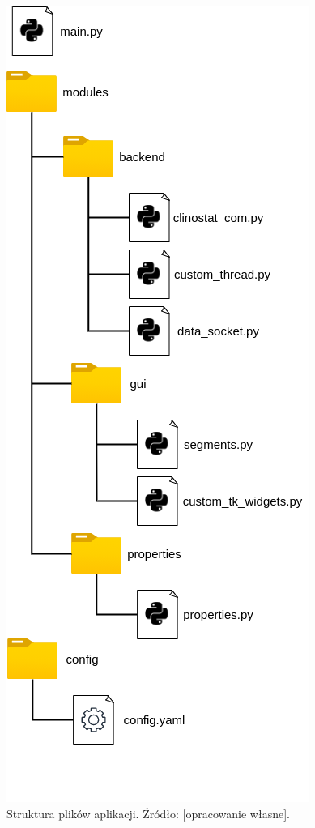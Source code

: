 \begin{figure}[h]
	
	\centering
	\includegraphics[scale=.34]{tree}
	\caption{Struktura plików aplikacji. Źródło: [opracowanie własne].} 
	\label{fig:drzewo}
	
\end{figure}
